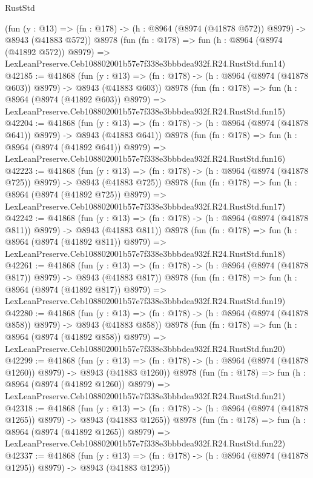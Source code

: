 \begin{lexlean}{RustStd}
\begin{coremodule}
    (fun (y : @13) => (fn : @178) -> (h : @8964 (@8974 (@41878 @572)) @8979) -> @8943 (@41883 @572))
    @8978
    (fun (fn : @178) =>
    fun (h : @8964 (@8974 (@41892 @572)) @8979) =>
    LexLeanPreserve.Ceb108802001b57e7f338e3bbbdea932f.R24.RustStd.fun14)
@42185 := @41868
    (fun (y : @13) => (fn : @178) -> (h : @8964 (@8974 (@41878 @603)) @8979) -> @8943 (@41883 @603))
    @8978
    (fun (fn : @178) =>
    fun (h : @8964 (@8974 (@41892 @603)) @8979) =>
    LexLeanPreserve.Ceb108802001b57e7f338e3bbbdea932f.R24.RustStd.fun15)
@42204 := @41868
    (fun (y : @13) => (fn : @178) -> (h : @8964 (@8974 (@41878 @641)) @8979) -> @8943 (@41883 @641))
    @8978
    (fun (fn : @178) =>
    fun (h : @8964 (@8974 (@41892 @641)) @8979) =>
    LexLeanPreserve.Ceb108802001b57e7f338e3bbbdea932f.R24.RustStd.fun16)
@42223 := @41868
    (fun (y : @13) => (fn : @178) -> (h : @8964 (@8974 (@41878 @725)) @8979) -> @8943 (@41883 @725))
    @8978
    (fun (fn : @178) =>
    fun (h : @8964 (@8974 (@41892 @725)) @8979) =>
    LexLeanPreserve.Ceb108802001b57e7f338e3bbbdea932f.R24.RustStd.fun17)
@42242 := @41868
    (fun (y : @13) => (fn : @178) -> (h : @8964 (@8974 (@41878 @811)) @8979) -> @8943 (@41883 @811))
    @8978
    (fun (fn : @178) =>
    fun (h : @8964 (@8974 (@41892 @811)) @8979) =>
    LexLeanPreserve.Ceb108802001b57e7f338e3bbbdea932f.R24.RustStd.fun18)
@42261 := @41868
    (fun (y : @13) => (fn : @178) -> (h : @8964 (@8974 (@41878 @817)) @8979) -> @8943 (@41883 @817))
    @8978
    (fun (fn : @178) =>
    fun (h : @8964 (@8974 (@41892 @817)) @8979) =>
    LexLeanPreserve.Ceb108802001b57e7f338e3bbbdea932f.R24.RustStd.fun19)
@42280 := @41868
    (fun (y : @13) => (fn : @178) -> (h : @8964 (@8974 (@41878 @858)) @8979) -> @8943 (@41883 @858))
    @8978
    (fun (fn : @178) =>
    fun (h : @8964 (@8974 (@41892 @858)) @8979) =>
    LexLeanPreserve.Ceb108802001b57e7f338e3bbbdea932f.R24.RustStd.fun20)
@42299 := @41868
    (fun (y : @13) =>
    (fn : @178) -> (h : @8964 (@8974 (@41878 @1260)) @8979) -> @8943 (@41883 @1260))
    @8978
    (fun (fn : @178) =>
    fun (h : @8964 (@8974 (@41892 @1260)) @8979) =>
    LexLeanPreserve.Ceb108802001b57e7f338e3bbbdea932f.R24.RustStd.fun21)
@42318 := @41868
    (fun (y : @13) =>
    (fn : @178) -> (h : @8964 (@8974 (@41878 @1265)) @8979) -> @8943 (@41883 @1265))
    @8978
    (fun (fn : @178) =>
    fun (h : @8964 (@8974 (@41892 @1265)) @8979) =>
    LexLeanPreserve.Ceb108802001b57e7f338e3bbbdea932f.R24.RustStd.fun22)
@42337 := @41868
    (fun (y : @13) =>
    (fn : @178) -> (h : @8964 (@8974 (@41878 @1295)) @8979) -> @8943 (@41883 @1295))

\end{coremodule}
\end{lexlean}

